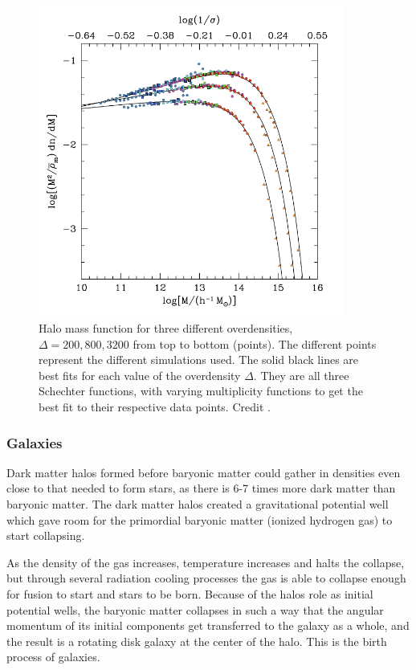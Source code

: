 \begin{figure}
    \centering
    \includegraphics[width=0.9\textwidth]{images/halo_mass_function.png}
    \caption{Halo mass function for three different overdensities, $\Delta = 200, 800, 3200$ from top to bottom (points). The different points represent the different simulations used. The solid black lines are best fits for each value of the overdensity $\Delta$. They are all three Schechter functions, with varying multiplicity functions to get the best fit to their respective data points. Credit \textcite{Tinker2008}.}
    \label{halo_mass}
\end{figure}

\subsubsection{Galaxies}
Dark matter halos formed before baryonic matter could gather in densities even close to that needed to form stars, as there is 6-7 times more dark matter than baryonic matter. The dark matter halos created a gravitational potential well which gave room for the primordial baryonic matter (ionized hydrogen gas) to start collapsing. 

As the density of the gas increases, temperature increases and halts the collapse, but through several radiation cooling processes the gas is able to collapse enough for fusion to start and stars to be born. Because of the halos role as initial potential wells, the baryonic matter collapses in such a way that the angular momentum of its initial components get transferred to the galaxy as a whole, and the result is a rotating disk galaxy at the center of the halo. This is the birth process of galaxies.

